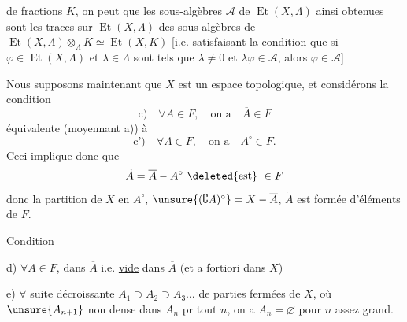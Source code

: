 

de fractions $K$, on peut  que les sous-algèbres $\mathcal A$ de $\operatorname{Et}(X,\Lambda)$ ainsi obtenues sont les traces sur $\operatorname{Et}(X,\Lambda)$ des sous-algèbres de $\operatorname{Et}(X,\Lambda)\otimes_\Lambda K\simeq\operatorname{Et}(X,K)$ [i.e. satisfaisant la condition que si $\varphi\in\operatorname{Et}(X,\Lambda)$  et $\lambda\in\Lambda$  sont tels que $\lambda\ne0$ et $\lambda\varphi\in\mathcal A$, alors $\varphi\in\mathcal A$]


Nous supposons maintenant que $X$ est un espace topologique, et considérons la condition
\[
\text{c)}\quad\forall A\in F,\quad\text{on a}\quad\overline A\in F
\]
équivalente (moyennant a)) à
\[
\text{c')}\quad\forall A\in F,\quad\text{on a}\quad A^\circ\in F.
\]
Ceci implique donc que
\[
\dot A=\overline A-A^\circ\ \deleted{\text{est}}\ \in F
\]
donc la  partition de $X$ en $A^\circ$, $\unsure{(\complement A)^\circ}=X-\overline A$, $\dot A$ est formée d'éléments de $F$.




Condition

d) $\forall A\in F$,   dans $\overline A$  i.e.     \uline{vide} dans $\overline A$ (et a fortiori dans $X$)

e)  $\forall$ suite décroissante $A_1\supset A_2\supset A_3\ldots$ de parties fermées  de $X$, où $\unsure{A_{n+1}}$ non dense dans $A_n$ pr tout $n$, on a $A_n=\varnothing$ pour $n$ assez grand.

